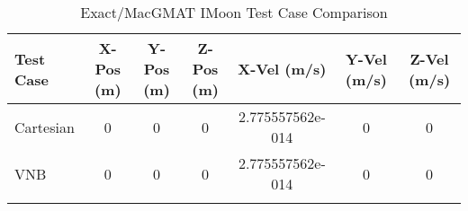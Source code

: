 \begin{table}[htbp!]
\centering
\caption{ Exact/MacGMAT IMoon Test Case Comparison}
      \begin{tabular}{lcccccc}
      \hline\hline
          Test Case & X-Pos (m) & Y-Pos (m) & Z-Pos (m) & X-Vel (m/s) & Y-Vel (m/s) & Z-Vel (m/s) \\
         \hline
         Cartesian & 0 & 0 & 0 & 2.775557562e-014 & 0 & 0 \\
         VNB & 0 & 0 & 0 & 2.775557562e-014 & 0 & 0 \\
      \hline\hline
      \label{Table: IMoon Exact-MacGMAT Table} 
\end{tabular}
\end{table}
